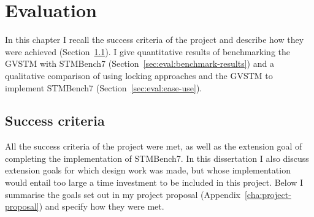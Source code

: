 \documentclass[12pt,a4paper,oneside,openright]{report}
\newcommand{\mycaption}[2]{\caption[#1]{#1 #2}}
\begin{document}




\chapter{Evaluation}

In this chapter I recall the success criteria of the project and
describe how they were achieved
(Section~\ref{sec:eval:success-criteria}). I give quantitative results
of benchmarking the GVSTM with STMBench7
(Section~\ref{sec:eval:benchmark-results}) and a qualitative
comparison of using locking approaches and the GVSTM to implement
STMBench7 (Section~\ref{sec:eval:ease-use}).

\section{Success criteria}
\label{sec:eval:success-criteria}

All the success criteria of the project were met, as well as the
extension goal of completing the implementation of STMBench7. In this
dissertation I also discuss extension goals for which design work was
made, but whose implementation would entail too large a time
investment to be included in this project. Below I summarise the goals
set out in my project proposal (Appendix~\ref{cha:project-proposal})
and specify how they were met.
\end{document}
